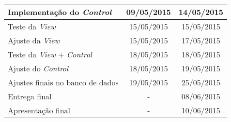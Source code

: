 \documentclass[a4paper,12pt]{article}
\begin{document}
{\begin{longtable}{|l|c|c|}
Implementação do \textit{Control}         & 09/05/2015                           & 14/05/2015                        \\ \hline



Teste da \textit{View}                    & 15/05/2015                           & 15/05/2015                        \\ \hline
Ajuste da \textit{View}                   & 15/05/2015                           & 17/05/2015                        \\ \hline
Teste da \textit{View} + \textit{Control} & 18/05/2015                           & 18/05/2015                        \\ \hline
Ajuste do \textit{Control}                & 18/05/2015                           & 19/05/2015                        \\ \hline
Ajustes finais no banco de dados          & 19/05/2015                           & 25/05/2015                        \\ \hline
Entrega final                             & \multicolumn{1}{c|}{-}               & 08/06/2015                        \\ \hline
Apresentação final                        & \multicolumn{1}{c|}{-}               & 10/06/2015                        \\ \hline
\end{longtable}
}
\end{document}
